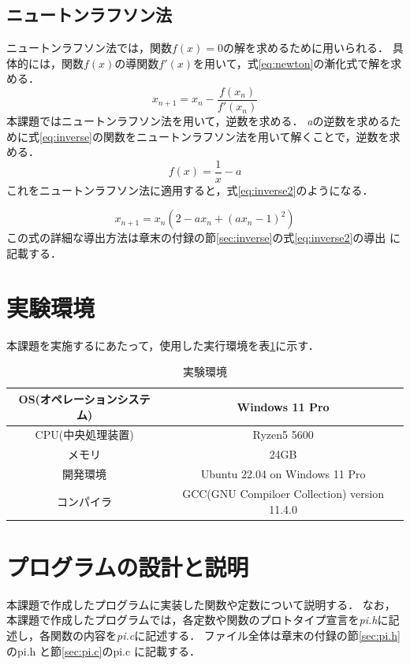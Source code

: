 \documentclass[a4paper,11pt,dvipdfmx]{jsarticle}
\begin{document}
\subsection{ニュートンラフソン法}
ニュートンラフソン法では，関数$f(x)=0$の解を求めるために用いられる．
具体的には，関数$f(x)$の導関数$f'(x)$を用いて，式\eqref{eq:newton}の漸化式で解を求める．
\begin{equation}
  \label{eq:newton}
  x_{n+1} = x_n - \frac{f(x_n)}{f'(x_n)}
\end{equation}
本課題ではニュートンラフソン法を用いて，逆数を求める．
\textit{a}の逆数を求めるために式\eqref{eq:inverse}の関数をニュートンラフソン法を用いて解くことで，逆数を求める．
\begin{equation}
  \label{eq:inverse}
  f(x) = \frac{1}{x} - a
\end{equation}
これをニュートンラフソン法に適用すると，式\eqref{eq:inverse2}のようになる．

\begin{equation}
  \label{eq:inverse2}
    x_{n+1} = x_n \left( 2 - ax_n + (ax_n - 1)^2 \right)
\end{equation}
この式の詳細な導出方法は章末の付録の節\ref{sec:inverse}の式\ref{eq:inverse2}の導出 に記載する．



\section{実験環境}
本課題を実施するにあたって，使用した実行環境を表\ref{table:environment}に示す．
\begin{table}[H]
\centering
\caption{実験環境}
\label{table:environment}
\begin{tabular}{c||c}
\hline
OS(オペレーションシステム)    & Windows 11 Pro   \\
\hline
CPU(中央処理装置)   & Ryzen5 5600 \\
\hline
メモリ & 24GB              \\
\hline
開発環境 & Ubuntu 22.04 on Windows 11 Pro   \\
\hline
コンパイラ & GCC(GNU Compiloer Collection) version 11.4.0 \\
\hline
\end{tabular}
\end{table}

\section{プログラムの設計と説明}
本課題で作成したプログラムに実装した関数や定数について説明する．
なお，本課題で作成したプログラムでは，各定数や関数のプロトタイプ宣言を\textit{pi.h}に記述し，各関数の内容を\textit{pi.c}に記述する．
ファイル全体は章末の付録の節\ref{sec:pi.h}のpi.h と節\ref{sec:pi.c}のpi.c に記載する．
\end{document}
